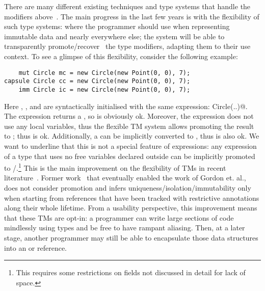 \noindent There are many different existing techniques and type systems that handle the modifiers above~\cite{ZibinEtAl10,ClarkeWrigstad03,HallerOdersky10,GordonEtAl12,ServettoZucca15}.
The main progress in the last few years is with the flexibility of such type systems:
 where the programmer should use \Q@imm@ when  representing immutable data
and \Q@mut@ nearly everywhere else; the system will be able to transparently promote/recover~\cite{GordonEtAl12,clebsch2015deny,ServettoZucca15} the type modifiers, adapting them to their use context.
To see a glimpse of this flexibility, consider the following example:
\saveSpace
\begin{lstlisting}
    mut Circle mc = new Circle(new Point(0, 0), 7);
capsule Circle cc = new Circle(new Point(0, 0), 7);
    imm Circle ic = new Circle(new Point(0, 0), 7);
\end{lstlisting}
\saveSpace
Here \Q@mc@, \Q@ic@, and \Q@cc@ are syntactically initialised with the same expression: \Q@new Circle(..)@.
The \Q@new@ expression returns a \Q@mut@, so \Q@mc@ is obviously ok.
Moreover, the expression does not use any \Q@mut@ local variables, thus the flexible TM system
allows promoting the \Q@mut@ result to \Q@capsule@; thus \Q@cc@ is ok. 
Additionally, a \Q@capsule@ can be implicitly converted to \Q@imm@, thus \Q@ic@ is also ok.
We want to underline that this is not a special feature of \Q@new@ expressions:
any expression of a \Q@mut@ type that uses no free \Q@mut@ variables declared outside can be implicitly promoted to \Q@capsule@/\Q@imm@.\footnote{
This requires some restrictions on \Q@read@ fields not discussed in detail for lack of space.
} This is the main improvement on the flexibility of TMs in recent literature~\cite{ServettoEtAl13a,ServettoZucca15,GordonEtAl12,clebsch2015deny,clebsch2017orca}.
Former work~\cite{Boyland10,boyland2003checking,Hogg91,Smith:2000:AT:645394.651903,DBLP:conf/pldi/AikenFKT03} that eventually enabled the work of Gordon et. al., does not consider promotion and 
infers uniqueness/isolation/immutability only when starting from references that have been tracked with restrictive annotations along their whole lifetime.
From a usability perspective, this improvement means that
these TMs are opt-in: a programmer can write large sections of code
mindlessly using \Q@mut@ types and be free to have rampant aliasing. 
Then, at a later stage, another programmer may still 
be able to encapsulate those data structures into an \Q@imm@ or \Q@capsule@ reference.

